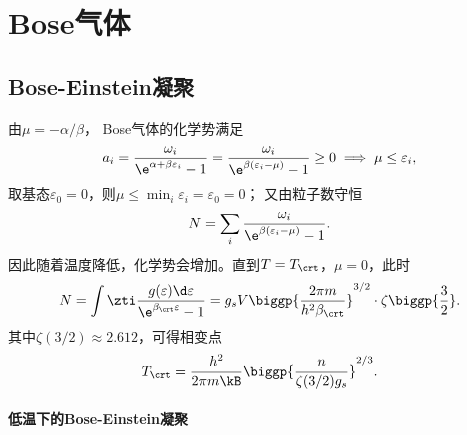 \section{Bose气体}

\subsection{Bose-Einstein凝聚}

由$\mu=-\alpha/\beta$，
Bose气体的化学势满足
\[
	a_i=\frac{\omega_i}{\e^{\alpha+\beta\varepsilon_i}-1}=\frac{\omega_i}{\e^{\beta(\varepsilon_i-\mu)}-1}\geq 0
	\implies\mu\leq\varepsilon_i,
\]
取基态$\varepsilon_0=0$，则$\mu\leq\min_i\varepsilon_i=\varepsilon_0=0$；
又由粒子数守恒
\[
	N=\sum_i\frac{\omega_i}{\e^{\beta(\varepsilon_i-\mu)}-1}.
\]
因此随着温度降低，化学势会增加。直到$T=T_\crt$，$\mu=0$，此时
\[
	N=\int\zti\frac{g(\varepsilon)\d\varepsilon}{\e^{\beta_\crt\varepsilon}-1}
	=g_sV\biggp{\frac{2\pi m}{h^2\beta_\crt}}^{3/2}\cdot\zeta\biggp{\frac32}.
\]
其中$\zeta(3/2)\approx 2.612$，可得相变点
\begin{equation}
	\label{eqn:Bose TC}
	T_\crt=\frac{h^2}{2\pi m\kB}\biggp{\frac n{\zeta(3/2)g_s}}^{2/3}.
\end{equation}

\paragraph{低温下的Bose-Einstein凝聚}

